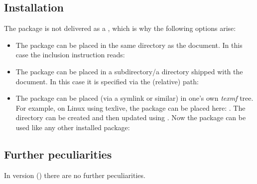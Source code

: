 \documentclass{sopra-base}
\begin{document}
\subsection{Installation}
    The package is not delivered as a , which is why the
    following options arise:
    \begin{itemize}
        \item The package can be placed in the same directory as the
                document. In this case the inclusion instruction reads:
\begin{plainlatex}
\usepackage{sopra-changelog}
\end{plainlatex}
        \item The package can be placed in a subdirectory/a directory
                shipped with the document. In this case it is specified
                via the (relative) path:
\begin{plainlatex}
\usepackage{./My/Path/to/sopra-changelog}
\end{plainlatex}
        \item The package can be placed (via a symlink or similar)
              in one's own \emph{texmf} tree.
              For example, on Linux using texlive,
              the package can be placed here: .
              The directory can be created and then updated using
              . Now
              the package can be used like any other installed package:
\begin{plainlatex}
\usepackage{sopra-changelog}
\end{plainlatex}
    \end{itemize}

\subsection{Further peculiarities}
In version \thesocversion{} () there are no further
peculiarities.

%
%
%
%
\end{document}
